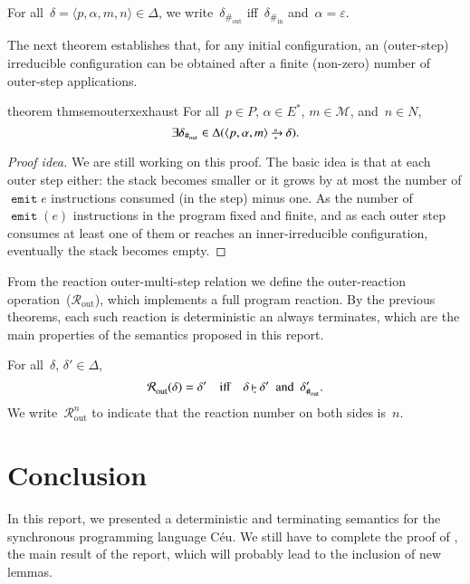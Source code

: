 \documentclass[10pt,a4paper,oneside,leqno]{article}
\makeatletter
\numberwithin{equation}{section}
\def\Ceu{C\'eu}
\let\nil=\varepsilon
\def\<#1>{\langle#1\rangle}
\def\Hinner{{\#_{\mathrm{in}}}}
\def\Houter{{\#_{\mathrm{out}}}}
\newcommand\Router[1][]{{\mathcal{R}_{\mathrm{out}}^{#1}}}
\def\@inner#1#2{%
  \setbox0=\hbox{$\vdash$}%
  \setbox1=\hbox{$\scriptscriptstyle#1$}%
  \setbox2=\hbox{$\scriptscriptstyle#2$}%
  \ifdim\wd1>\wd2
    \setbox2=\hbox to\wd1{\hfil$\scriptscriptstyle#2$\hfil}%
  \else
    \setbox1=\hbox to\wd2{\hfil$\scriptscriptstyle#1$\hfil}%
  \fi
  \setbox3=\hbox{$\null^{\box1}_{\box2}$}%
  \dimen0=.6ex
  \ifdim\wd3>\dimen0
    \dimen0=\wd3
  \fi
  \rlap{\hbox{$\vrule height\the\ht0 depth\the\dp0 width.6pt
      \vcenter{\hrule height.3pt depth.3pt width\dimen0}$}}%
  \kern1pt\box3
}
\newcommand{\inner}[2][]{\mathbin{\@inner{#2}{#1}}}
\newcommand{\innerx}[1]{\inner[\ast]{#1}}
\def\@outer#1#2{%
  \setbox0=\hbox{$\to$}%
  \setbox1=\hbox{$\scriptscriptstyle#1$}%
  \setbox2=\hbox{$\scriptscriptstyle#2$}%
  \ifdim\wd1>\wd2
    \setbox2=\hbox to\wd1{\hfil$\scriptscriptstyle#2$\hfil}%
  \else
    \setbox1=\hbox to\wd2{\hfil$\scriptscriptstyle#1$\hfil}%
  \fi
  \setbox3=\hbox{$\null^{\box1}_{\box2}$}%
  \dimen0=\wd0
  \dimen1=\dimexpr(\wd0-\wd3)/2-.8pt
  \rlap{\box0}\rlap{\kern\dimen1\box3}\hskip\dimen0
}
\newcommand{\outeri}[2][]{\mathbin{\@outer{#2}{#1}}}
\newcommand{\outerx}[1]{\outeri[+]{#1}}
\def\@ceuop#1{\mathop{\texttt{#1}}}%
\def\@ceubin#1{\mathbin{\texttt{#1}}}%
\def\ceu{\protect\@ceu}
\def\@ceu#1{%
  \bgroup
  \def\Skip{\@ceuop{skip}}%
  \def\Mem{\@ceuop{mem}}%
  \def\Attr##1##2{##1\coloneqq##2}%
  \def\Await{\@ceuop{await}}%
  \def\Emit{\@ceuop{emit}}%
  \def\Break{\@ceuop{break}}%
  \def\Ifelse##1##2##3{\@ceuop{if}##1\@ceuop{then}{##2}\@ceuop{else}{##3}}%
  \def\Loop{\@ceuop{loop}}%
  \def\And{\@ceubin{and}}%
  \def\Or{\@ceubin{or}}%
  \def\Fin{\@ceuop{fin}}%
  \def\Awaiting{\@ceuop{@awaiting}}%
  \def\Emitting{\@ceuop{@emitting}}%
  \def\Atloop{\@ceuop{@loop}}%
  \ensuremath{#1}\ignorespaces
  \egroup
}
\makeatother
\begin{document}
\begin{definition}[label={def:sem:outer:irreducible},
  name={Outer-step irreducible configuration}]
  For all~$\delta=\<p,\alpha,m,n>\in\Delta$, we write~$\delta_\Houter$
  iff~$\delta_\Hinner$ and~$\alpha=\nil$.
\end{definition}

The next theorem establishes that, for any initial configuration, an
(outer-step) irreducible configuration can be obtained after a finite
(non-zero) number of outer-step applications.

\begin{restatable}[label={thm:sem:outerx:exhaust}]{theorem}
  {thmsemouterxexhaust}
  For all~$p\in{P}$, $\alpha\in{E^*}$, $m\in\mathcal{M}$, and~$n\in{N}$,
  \[
    \exists\delta_\Houter\in\Delta(\<p,\alpha,m>\outerx{n}\delta).
  \]
\end{restatable}
\begin{proof}[Proof idea]
  We are still working on this proof.  The basic idea is that at each outer
  step either: the stack becomes smaller or it grows by at most the number
  of \ceu{\Emit{e}} instructions consumed (in the step) minus one.  As the
  number of \ceu{\Emit(e)} instructions in the program fixed and finite, and
  as each outer step consumes at least one of them or reaches an
  inner-irreducible configuration, eventually the stack becomes empty.
\end{proof}

From the reaction outer-multi-step relation we define the outer-reaction
operation~($\Router$), which implements a full program reaction.  By the
previous theorems, each such reaction is deterministic an always terminates,
which are the main properties of the semantics proposed in this report.

\begin{definition}[name={Outer reaction},label={def:outer:R}]
  For all~$\delta$, $\delta'\in\Delta$,
  \[
    \Router(\delta)=\delta'
    \quad\text{iff}\quad
    \delta\innerx{}\delta'
    \enspace\text{and}\enspace
    \delta'_\Houter.
  \]
  We write~$\Router[n]$ to indicate that the reaction number on both sides
  is~$n$.
\end{definition}


\section{Conclusion}
\label{sec:final}

In this report, we presented a deterministic and terminating semantics for
the synchronous programming language \Ceu.  We still have to complete the
proof of , the main result of the report, which
will probably lead to the inclusion of new lemmas.
\end{document}
